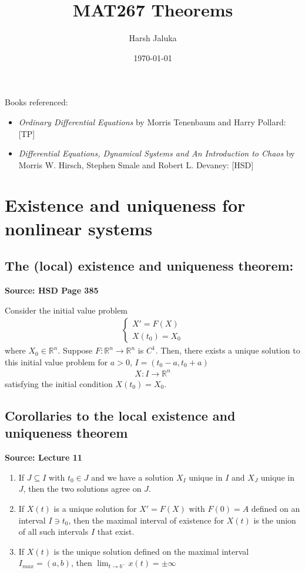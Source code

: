 \documentclass[11pt]{article}
\title{MAT267 Theorems}
\author{Harsh Jaluka}
\date{\today}
\newcommand{\R}{\mathbb{R}}
\begin{document}
\begin{titlepage}
\maketitle 
\end{titlepage}

\newpage

\tableofcontents

\newpage 
Books referenced: 
\begin{itemize}
    \item \emph{Ordinary Differential Equations} by Morris Tenenbaum and Harry Pollard: [TP]
    \item \emph{Differential Equations, Dynamical Systems and An Introduction to Chaos} by Morris W. Hirsch, Stephen Smale and Robert L. Devaney: [HSD]
\end{itemize}

\newpage

\section{Existence and uniqueness for nonlinear systems}

\subsection{The (local) existence and uniqueness theorem:}
\textbf{Source: HSD Page 385}

Consider the initial value problem 
\begin{align*}
    \begin{cases}
    X' = F(X) \\
    X(t_0) = X_0
    \end{cases}
\end{align*}
where $X_0 \in \R^n$. Suppose $F: \R^n \to \R^n$ is $C^1$. Then, there exists a unique solution to this initial value problem for $a > 0$, $I = (t_0 - a, t_0 + a) $
\begin{align*}
    X: I \to \R^n
\end{align*}
satisfying the initial condition $X(t_0) = X_0$. 

\subsection{Corollaries to the local existence and uniqueness theorem}
\textbf{Source: Lecture 11}
\begin{enumerate}
    \item If $J \subseteq I$ with $t_0 \in J$ and we have a solution $X_I$ unique in $I$ and $X_J$ unique in $J$, then the two solutions agree on $J$. \item If $X(t)$ is a unique solution for $X' = F(X)$ with $F(0) = A$ defined on an interval $I \ni t_0$, then the maximal interval of existence for $X(t)$ is the union of all such intervals $I$ that exist. 
    \item If $X(t)$ is the unique solution defined on the maximal interval $I_{max}= (a,b)$, then $\lim_{t \to b^-} x(t) = \pm \infty$
\end{enumerate}
\end{document}
